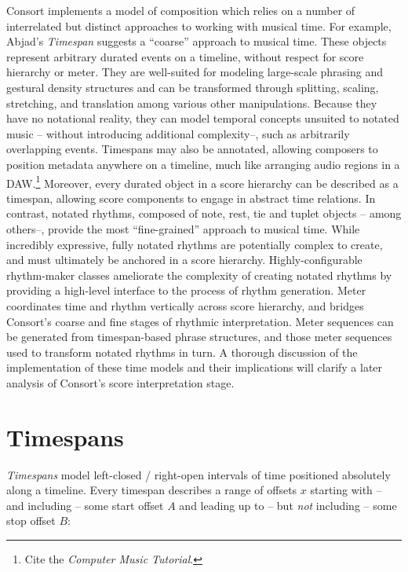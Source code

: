 Consort implements a model of composition which relies on a number of
interrelated but distinct approaches to working with musical time. For example,
Abjad's \emph{Timespan} suggests a \enquote{coarse} approach to musical
time. These objects represent arbitrary durated events on a timeline, without
respect for score hierarchy or meter. They are well-suited for modeling
large-scale phrasing and gestural density structures and can be transformed
through splitting, scaling, stretching, and translation among various other
manipulations. Because they have no notational reality, they can model
temporal concepts unsuited to notated music -- without introducing additional
complexity--, such as arbitrarily overlapping events. Timespans may also be
annotated, allowing composers to position metadata anywhere on a timeline, much
like arranging audio regions in a DAW.\footnote{Cite the \emph{Computer Music
Tutorial}.} Moreover, every durated object in a score hierarchy can be
described as a timespan, allowing score components to engage in abstract time
relations. In contrast, notated rhythms, composed of note, rest, tie and tuplet
objects -- among others--, provide the most \enquote{fine-grained} approach to
musical time. While incredibly expressive, fully notated rhythms are
potentially complex to create, and must ultimately be anchored in a score
hierarchy. Highly-configurable rhythm-maker classes ameliorate the complexity
of creating notated rhythms by providing a high-level interface to the process
of rhythm generation. Meter coordinates time and rhythm vertically across
score hierarchy, and bridges Consort's coarse and fine stages of rhythmic
interpretation. Meter sequences can be generated from timespan-based phrase
structures, and those meter sequences used to transform notated rhythms in
turn. A thorough discussion of the implementation of these time models and
their implications will clarify a later analysis of Consort's score
interpretation stage.

\section{Timespans}
\label{sec:timespans}

\emph{Timespans} model left-closed / right-open intervals of time positioned
absolutely along a timeline. Every timespan describes a range
of offsets $x$ starting with -- and including -- some start offset $A$ and
leading up to -- but \emph{not} including -- some stop offset $B$:

